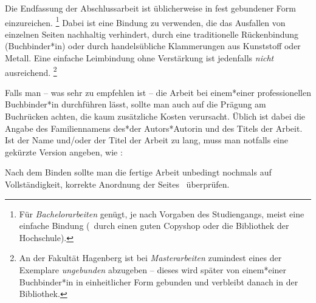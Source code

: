 Die Endfassung der Abschlussarbeit ist üblicherweise in fest gebundener Form
einzureichen.%
\footnote{Für \emph{Bachelorarbeiten} genügt, je nach Vorgaben des
Studiengangs, meist eine einfache Bindung (\zB\ durch einen guten Copyshop
oder die Bibliothek der Hochschule).}
Dabei ist eine Bindung zu verwenden, die das Ausfallen von einzelnen Seiten
nachhaltig verhindert, \zB durch eine traditionelle Rückenbindung
(Buchbinder*in) oder durch handelsübliche Klammerungen aus Kunststoff oder
Metall. Eine einfache Leimbindung ohne Verstärkung ist jedenfalls
\emph{nicht} ausreichend.%
\footnote{An der Fakultät Hagenberg ist bei \emph{Masterarbeiten} zumindest
eines der Exemplare \emph{ungebunden} abzugeben -- dieses wird später von
einem*einer Buchbinder*in in einheitlicher Form gebunden und verbleibt danach
in der Bibliothek.}

Falls man -- was sehr zu empfehlen ist -- die Arbeit bei einem*einer
professionellen Buchbinder*in durchführen lässt, sollte man auch auf die
Prägung am Buchrücken achten, die kaum zusätzliche Kosten verursacht. Üblich
ist dabei die Angabe des Familiennamens des*der Autors*Autorin und des Titels
der Arbeit. Ist der Name und/oder der Titel der Arbeit zu lang, muss man 
notfalls eine gekürzte Version angeben, wie \zB:
%
\begin{center}
	\setlength{\fboxsep}{3mm}
\end{center}
%
Nach dem Binden sollte man die fertige Arbeit unbedingt nochmals auf 
Vollständigkeit, korrekte Anordnung der Seites \etc\ überprüfen.



